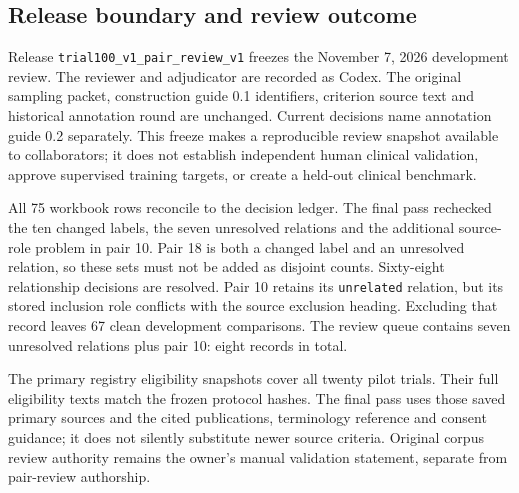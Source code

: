 \documentclass[10pt,letterpaper]{article}
\newcommand{\pathcode}[1]{\nolinkurl{#1}}
\begin{document}
\subsection{Release boundary and review outcome}
Release \pathcode{trial100_v1_pair_review_v1} freezes the November 7, 2026
development review. The reviewer and adjudicator are recorded as Codex.
The original sampling packet, construction guide 0.1 identifiers, criterion
source text and historical annotation round are unchanged. Current decisions
name annotation guide 0.2 separately. This freeze makes a reproducible review
snapshot available to collaborators; it does not establish independent human
clinical validation, approve supervised training targets, or create a held-out
clinical benchmark.

All 75 workbook rows reconcile to the decision ledger. The final pass
rechecked the ten changed labels, the seven unresolved relations and the
additional source-role problem in pair 10. Pair 18 is both a changed label and
an unresolved relation, so these sets must not be added as disjoint counts.
Sixty-eight relationship decisions are resolved. Pair 10 retains its
\pathcode{unrelated} relation, but its stored inclusion role conflicts with
the source exclusion heading. Excluding that record leaves 67 clean
development comparisons. The review queue contains seven unresolved
relations plus pair 10: eight records in total.

The primary registry eligibility snapshots cover all twenty pilot trials.
Their full eligibility texts match the frozen protocol hashes. The final
pass uses those saved primary sources and the cited publications,
terminology reference and consent guidance; it does not silently substitute
newer source criteria. Original corpus review authority remains the
owner's manual validation statement, separate from pair-review authorship.
\end{document}
